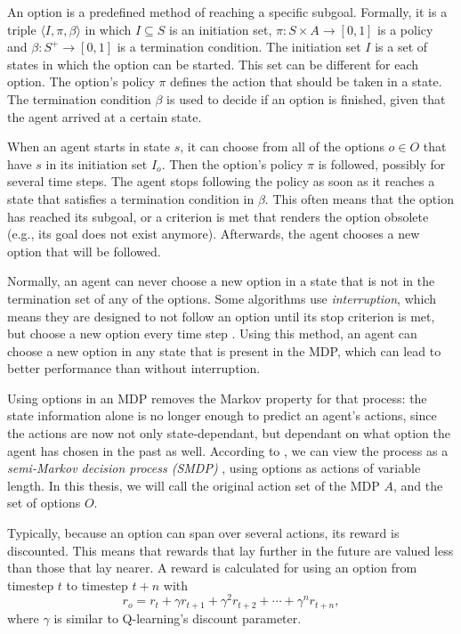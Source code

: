 An option is a predefined method of reaching a specific subgoal. Formally, it is
a triple $\langle I, \pi, \beta \rangle$ in which $I \subseteq S$ is an
initiation set, $\pi: S \times A \rightarrow [0, 1]$ is a policy and $\beta: S^+
\rightarrow [0,1]$ is a termination condition. The initiation set $I$ is a set of
states in which the option can be started. This set can be different for each
option. The option's policy $\pi$ defines the action that should be taken in a
state. The termination condition $\beta$ is used to decide if an option is
finished, given that the agent arrived at a certain state.

When an agent starts in state $s$, it can choose from all of the options $o \in
O$ that have $s$ in its initiation set $I_o$. Then the option's policy $\pi$ is
followed, possibly for several time steps. The agent stops following the policy
as soon as it reaches a state that satisfies a termination condition in $\beta$.
This often means that the option has reached its subgoal, or a criterion is met
that renders the option obsolete (e.g., its goal does not exist anymore).
Afterwards, the agent chooses a new option that will be followed.


Normally, an agent can never choose a new option in a state that is not in the
termination set of any of the options. Some algorithms use \emph{interruption},
which means they are designed to not follow an option until its stop criterion
is met, but choose a new option every time step \cite{sutton1999between,
precup2000temporal}. Using this method, an agent can choose a new option in any
state that is present in the MDP, which can lead to better performance than
without interruption.

Using options in an MDP removes the Markov property for that process: the state
information alone is no longer enough to predict an agent's actions, since the
actions are now not only state-dependant, but dependant on what option the agent
has chosen in the past as well. According to \cite{sutton1999between}, we can
view the process as a \emph{semi-Markov decision process (SMDP)}
\cite{duff1995reinforcement}, using options as actions of variable length. In
this thesis, we will call the original action set of the MDP $A$, and the set of
options $O$.

Typically, because an option can span over several actions, its reward is
discounted. This means that rewards that lay further in the future are valued
less than those that lay nearer. A reward is calculated for using an option from
timestep $t$ to timestep $t+n$ with
\begin{equation}
	\label{eq:option-reward}
	r_o = r_{t} + \gamma r_{t+1} + \gamma^2 r_{t+2} + \cdots + \gamma^n r_{t+n},
\end{equation}
where $\gamma$ is similar to Q-learning's discount parameter.


